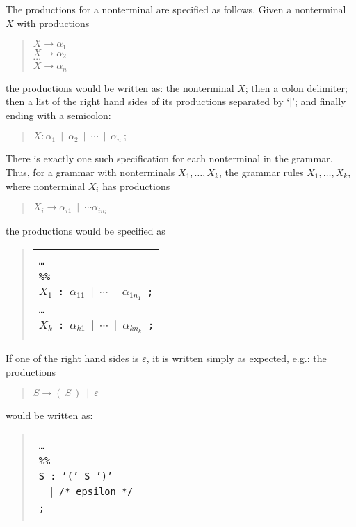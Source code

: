 \documentclass{article}
\begin{document}
The productions for a nonterminal are specified as follows.  Given a
nonterminal $X$ with productions
%
\begin{quote}
$X \rightarrow \alpha_1$\\
$X \rightarrow \alpha_2$\\
$\cdots$\\
$X \rightarrow \alpha_n$
\end{quote}
%
the productions would be written as: the nonterminal $X$; then
a colon delimiter; then a list of the right hand sides of its productions
separated by `$\mid$'; and finally ending with a semicolon:
%
\begin{quote}
$X : \alpha_1 ~\mid~ \alpha_2 ~\mid~ \cdots ~\mid~ \alpha_n ~;$
\end{quote}
%
There is exactly one such specification for each nonterminal in the grammar.
Thus, for a grammar with nonterminals $X_1, \ldots, X_k$, the grammar rules
$X_1, \ldots, X_k$, where nonterminal $X_i$ has productions
%
\begin{quote}
$X_i \rightarrow \alpha_{i1} ~\mid~ \cdots \alpha_{in_i}$
\end{quote}
%
the productions would be specified as
%
\begin{quote}
\begin{tabular}{|l|}\hline
\begin{minipage}{3.5in}
\ \\
{\tt \ldots}\\
{\tt \%\%}\\
{\tt $X_1$ : $\alpha_{11} ~\mid~ \cdots ~\mid~ \alpha_{1n_1}$ ;}\\
{\tt \ldots}\\
{\tt $X_k$ : $\alpha_{k1} ~\mid~ \cdots ~\mid~ \alpha_{kn_k}$ ;}\\
\end{minipage}
\\ \hline
\end{tabular}
\end{quote}
%
If one of the right hand sides is $\varepsilon$, it is written simply
as expected, e.g.: the productions
%
\begin{quote}
$S \rightarrow ( ~ S ~) ~\mid~ \varepsilon$
\end{quote}
%
would be written as:
%
\begin{quote}
\begin{tabular}{|l|}\hline
\begin{minipage}{3.5in}
\ \\
{\tt \ldots}\\
{\tt \%\%}\\
{\tt S : '(' S ')'}\\
{\tt \verb+  +$|$ /* epsilon */}\\
{\tt ;}\\
\end{minipage}
\\ \hline
\end{tabular}
\end{quote}
\end{document}

